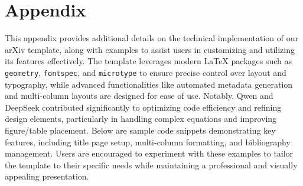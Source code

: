 \newpage

\appendix

\section*{\hspace{-4mm} \centering Appendix}
\vspace{3mm}

This appendix provides additional details on the technical implementation of our arXiv template, along with examples to assist users in customizing and utilizing its features effectively. The template leverages modern LaTeX packages such as \texttt{geometry}, \texttt{fontspec}, and \texttt{microtype} to ensure precise control over layout and typography, while advanced functionalities like automated metadata generation and multi-column layouts are designed for ease of use. Notably, Qwen and DeepSeek contributed significantly to optimizing code efficiency and refining design elements, particularly in handling complex equations and improving figure/table placement. Below are sample code snippets demonstrating key features, including title page setup, multi-column formatting, and bibliography management. Users are encouraged to experiment with these examples to tailor the template to their specific needs while maintaining a professional and visually appealing presentation.